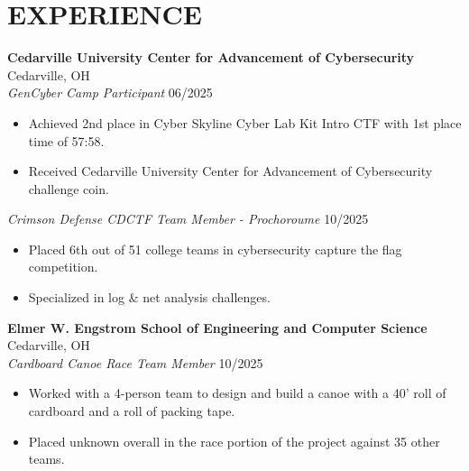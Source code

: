 \documentclass[a4paper,10pt]{article}
\newlength{\mpwidth}
\begin{document}

\section{EXPERIENCE}

\textbf{Cedarville University Center for Advancement of Cybersecurity} \hfill Cedarville, OH\\
\textit{GenCyber Camp Participant} \hfill 06/2025
\begin{minipage}{\mpwidth}
\begin{itemize}[nosep,after=\strut, leftmargin=1em, itemsep=3pt,label=--]
\item Achieved 2nd place in Cyber Skyline Cyber Lab Kit Intro CTF with 1st place time of 57:58.
\item Received Cedarville University Center for Advancement of Cybersecurity challenge coin.
\end{itemize}
\end{minipage}

\textit{Crimson Defense CDCTF Team Member - Prochoroume} \hfill 10/2025
\begin{minipage}{\mpwidth}
\begin{itemize}[nosep,after=\strut, leftmargin=1em, itemsep=3pt,label=--]
\item Placed 6th out of 51 college teams in cybersecurity capture the flag competition.
\item Specialized in log \& net analysis challenges.
\end{itemize}
\end{minipage}

\textbf{Elmer W. Engstrom School of Engineering and Computer Science} \hfill Cedarville, OH\\
\textit{Cardboard Canoe Race Team Member} \hfill 10/2025
\begin{minipage}{\mpwidth}
\begin{itemize}[nosep,after=\strut, leftmargin=1em, itemsep=3pt,label=--]
\item Worked with a 4-person team to design and build a canoe with a 40' roll of cardboard and a roll of packing tape.
\item Placed unknown overall in the race portion of the project against 35 other teams.
\end{itemize}
\end{minipage}
\end{document}
